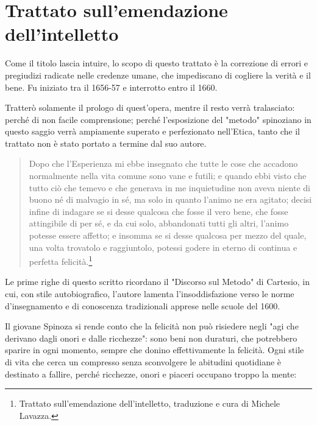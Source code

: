 \chapter{Trattato sull'emendazione dell'intelletto}

\bigskip
\bigskip
\bigskip

Come il titolo lascia intuire, lo scopo di questo trattato è la correzione di errori e pregiudizi radicate nelle credenze umane, che impediscano di cogliere la verità e il bene. Fu iniziato tra il 1656-57 e interrotto entro il 1660.

Tratterò solamente il prologo di quest'opera, mentre il resto verrà tralasciato: perché di non facile comprensione; perché l'esposizione del "metodo" spinoziano in questo saggio verrà ampiamente superato  e perfezionato nell'Etica, tanto che il trattato non è stato portato a termine dal suo autore.

\begin{quotation}
	\small Dopo che l'Esperienza mi ebbe insegnato che tutte le cose che accadono normalmente nella vita
	comune sono vane e futili; e quando ebbi visto che tutto ciò che temevo e che generava in me
	inquietudine non aveva niente di buono né di malvagio in sé, ma solo in quanto l'animo ne era
	agitato; decisi infine di indagare se si desse qualcosa che fosse il vero bene, che fosse attingibile di
	per sé, e da cui solo, abbandonati tutti gli altri, l'animo potesse essere affetto; e insomma se si desse
	qualcosa per mezzo del quale, una volta trovatolo e raggiuntolo, potessi godere in eterno di continua
	e perfetta felicità.\footnote{Trattato sull'emendazione dell'intelletto, traduzione e cura di Michele Lavazza.}
\end{quotation}

Le prime righe di questo scritto ricordano il "Discorso sul Metodo" di Cartesio, in cui, con stile autobiografico, l'autore lamenta l'insoddisfazione verso le norme d'insegnamento e di conoscenza tradizionali apprese nelle scuole del 1600.

Il giovane Spinoza si rende conto che la felicità non può risiedere negli "agi che derivano dagli
onori e dalle ricchezze": sono beni non duraturi, che potrebbero sparire in ogni momento, sempre che donino effettivamente la felicità. Ogni stile di vita che cerca un compresso senza sconvolgere le abitudini quotidiane è destinato a fallire, perché ricchezze, onori e piaceri occupano troppo la mente:


